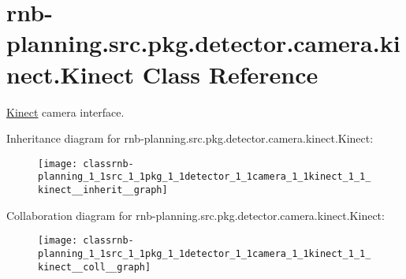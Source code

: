 \hypertarget{classrnb-planning_1_1src_1_1pkg_1_1detector_1_1camera_1_1kinect_1_1_kinect}{}\section{rnb-\/planning.src.\+pkg.\+detector.\+camera.\+kinect.\+Kinect Class Reference}
\label{classrnb-planning_1_1src_1_1pkg_1_1detector_1_1camera_1_1kinect_1_1_kinect}


\hyperlink{classrnb-planning_1_1src_1_1pkg_1_1detector_1_1camera_1_1kinect_1_1_kinect}{Kinect} camera interface.  




Inheritance diagram for rnb-\/planning.src.\+pkg.\+detector.\+camera.\+kinect.\+Kinect\+:
\nopagebreak
\begin{figure}[H]
\begin{center}
\leavevmode
\texttt{[image: classrnb-planning\_1\_1src\_1\_1pkg\_1\_1detector\_1\_1camera\_1\_1kinect\_1\_1\_kinect\_\_inherit\_\_graph]}
\end{center}
\end{figure}


Collaboration diagram for rnb-\/planning.src.\+pkg.\+detector.\+camera.\+kinect.\+Kinect\+:
\nopagebreak
\begin{figure}[H]
\begin{center}
\leavevmode
\texttt{[image: classrnb-planning\_1\_1src\_1\_1pkg\_1\_1detector\_1\_1camera\_1\_1kinect\_1\_1\_kinect\_\_coll\_\_graph]}
\end{center}
\end{figure}
